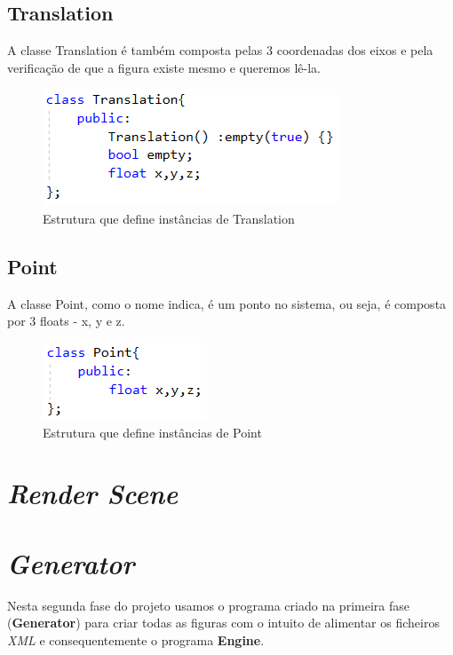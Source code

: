 \documentclass[a4paper]{article}
\begin{document}
\subsection{Translation}
\label{sec:translation}

A classe Translation é também composta pelas 3 coordenadas dos eixos e pela verificação de que a figura existe mesmo e queremos lê-la.

\begin{figure}[H]
\centering
\includegraphics[scale=0.8]{translation.png}
\caption{Estrutura que define instâncias de Translation}
\label{img:Tree}
\end{figure}


\subsection{Point}
\label{sec:point}

A classe Point, como o nome indica, é um ponto no sistema, ou seja, é composta por 3 floats - x, y e z.

\begin{figure}[H]
\centering
\includegraphics[scale=0.8]{point.png}
\caption{Estrutura que define instâncias de Point}
\label{img:Point}
\end{figure}


\newpage

\section{\textit{Render Scene}}

\newpage

\section{\textit{Generator}}

Nesta segunda fase do projeto usamos o programa criado na primeira fase (\textbf{Generator}) para criar todas as figuras com o intuito de alimentar os ficheiros \emph{XML} e consequentemente o programa \textbf{Engine}.
\end{document}
